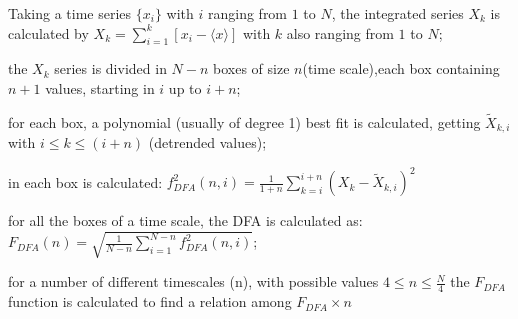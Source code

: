 \documentclass[article]{jss}
\begin{document}
\begin{description}

  \label{steps:dfa}
  \item Taking a time series \(\{x_{i}\}\) with \(i\) ranging from \(1\) to \(N\), the integrated series \(X_{k}\) is calculated by \(X_{k} = \sum_{i=1}^{k}\left[x_{i} - \langle x \rangle \right] \) with \(k\) also ranging from \(1\) to \(N\);
  \item the  \(X_{k}\) series is divided in \(N - n\) boxes of size \(n\)(time scale),each box containing \(n + 1\) values, starting in \(i\) up to \(i + n\);
  \item for each box, a polynomial (usually of degree 1) best fit is calculated, getting \(\widetilde{X}_{k, i}\) with \( i \le k \le (i + n) \) (detrended values);
  \item in each box is calculated: \(f_{DFA}^{2}(n, i) = \frac{1}{1+n} \sum_{k=i}^{i + n}(X_{k}-\widetilde{X}_{k, i})^{2}\)
  \item for all the boxes of a time scale, the DFA is calculated as:\\[10pt]
        \(F_{DFA}(n) = \sqrt{\frac{1}{N - n} \sum_{i=1}^{N-n} f_{DFA}^{2}(n, i)}\);
  \item for a number of different timescales (n), with possible values \( 4 \le n \le \frac{N}{4}\) the \(F_{DFA}\) function is calculated to find a relation among \(F_{DFA} \times n\)

\end{description}
\end{document}
